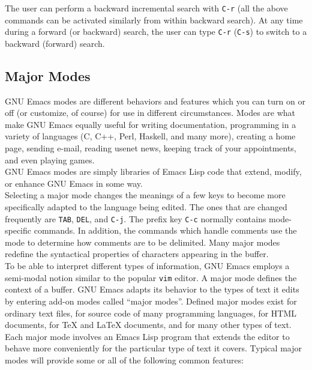 \documentclass[12pt,a4paper,oneside]{article}
\begin{document}
The user can perform a backward incremental search with \texttt{C-r} (all the above commands can be activated similarly from within backward search). At any time during a forward (or backward) search, the user can type \texttt{C-r} (\texttt{C-s}) to switch to a backward (forward) search.

\subsection{Major Modes}
GNU Emacs modes are different behaviors and features which you can turn on or off (or customize, of course) for use in different circumstances. Modes are what make GNU Emacs equally useful for writing documentation, programming in a variety of languages (C, C++, Perl, Haskell, and many more), creating a home page, sending e-mail, reading usenet news, keeping track of your appointments, and even playing games.\\

GNU Emacs modes are simply libraries of Emacs Lisp code that extend, modify, or enhance GNU Emacs in some way.\\

Selecting a major mode changes the meanings of a few keys to become more specifically adapted to the language being edited. The ones that are changed frequently are \texttt{TAB}, \texttt{DEL}, and \texttt{C-j}. The prefix key \texttt{C-c} normally contains mode-specific commands. In addition, the commands which handle comments use the mode to determine how comments are to be delimited. Many major modes redefine the syntactical properties of characters appearing in the buffer.\\

To be able to interpret different types of information, GNU Emacs employs a semi-modal notion similar to the popular \texttt{vim} editor. A major mode defines the context of a buffer. GNU Emacs adapts its behavior to the types of text it edits by entering add-on modes called ``major modes''. Defined major modes exist for ordinary text files, for source code of many programming languages, for HTML documents, for {\TeX} and {\LaTeX} documents, and for many other types of text. Each major mode involves an Emacs Lisp program that extends the editor to behave more conveniently for the particular type of text it covers. Typical major modes will provide some or all of the following common features:
\end{document}
